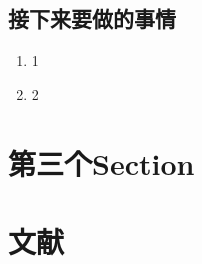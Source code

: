 \documentclass[UTF8,fancyhdr,a4paper]{ctexart}
\begin{document}
\subsection{接下来要做的事情}
\begin{enumerate}
      \item 1
      \item 2


\end{enumerate}

\newpage
\section{第三个Section}

\newpage
\section{文献}


\end{document}
